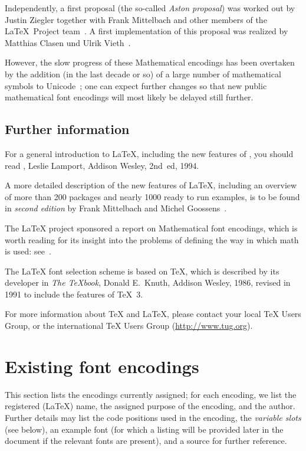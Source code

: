 \documentclass{ltxguide}[1994/11/20]
\begin{document}
Independently, a first proposal (the so-called \emph{Aston proposal}) was worked
out by Justin Ziegler together with Frank Mittelbach and other members of the
\LaTeX\ Project team~\cite{ziegler}. A first implementation of
this proposal was realized by Matthias Clasen und Ulrik
Vieth~\cite{clasen,clasen-vieth}.

However, the slow progress of these Mathematical encodings has been
overtaken by the addition (in the last decade or so) of a large number
of mathematical symbols to Unicode~\cite{beeton}; one can expect
further changes so that new public mathematical font encodings will
most likely be delayed still further.



\subsection{Further information}

For a general introduction to \LaTeX, including the new features of
\LaTeXe, you should read \emph{\LaTeXbook},
Leslie Lamport, Addison Wesley, 2nd~ed, 1994.

A more detailed description of the new features of \LaTeX, including an
overview of more than 200 packages and nearly 1000 ready to run examples, is
to be found in \emph{\LaTeXcomp{} second edition} by Frank Mittelbach and
Michel Goossens~\cite{A-W:MG2004}.

The \LaTeX{} project sponsored a report on Mathematical %
font encodings, which
is worth reading for its insight into the problems of defining the way
in which math is used: see~\cite{ziegler,clasen,clasen-vieth}.

The \LaTeX{} font selection scheme is based on \TeX, which is described
by its developer in \emph{The \TeX book}, Donald E.~Knuth, Addison
Wesley, 1986, revised in 1991 to include the features of \TeX~3.

For more information about \TeX{} and \LaTeX, please contact your local
\TeX{} Users Group, or the international \TeX{} Users Group
(\url{http://www.tug.org}).



\section{Existing font encodings}

This section lists the encodings currently assigned; for each
encoding, we list the registered (\LaTeX{}) name, the assigned purpose
of the encoding, and the author.  Further details may list the code
positions used in the encoding, the \emph{variable slots} (see below),
an example font (for which a listing will be provided later in the
document if the relevant fonts are present), and a source for further
reference.
\end{document}
